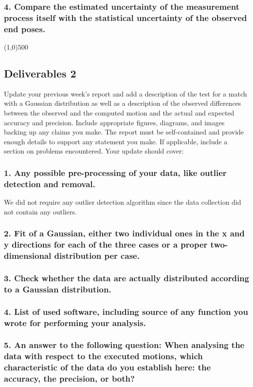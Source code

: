 \documentclass[11pt,a4paper,openright,twoside]{extreport}
\newcommand{\sectionLine}{\begin{center}\line(1,0){500}\end{center}}
\begin{document}
\subsubsection*{4. Compare the estimated uncertainty of the measurement process itself with the statistical uncertainty of the observed end poses.}

\sectionLine
\subsection*{Deliverables 2}
Update your previous week’s report and add a description of the test for a match with a Gaussian distribution as well as a description of the observed differences between the observed and the computed motion and the actual and expected accuracy and precision. Include appropriate figures, diagrams, and images backing up any claims you make. The report must be self-contained and provide enough details to support any statement you make. If applicable, include a section on problems encountered. Your update should cover:

\subsubsection*{1. Any possible pre-processing of your data, like outlier detection and removal.}
We did not require any outlier detection algorithm since the data collection did not contain any outliers.

\subsubsection*{2. Fit of a Gaussian, either two individual ones in the x and y directions for each of the three cases or a proper two-dimensional distribution per case.}

\subsubsection*{3. Check whether the data are actually distributed according to a Gaussian distribution.}

\subsubsection*{4. List of used software, including source of any function you wrote for performing your analysis.}

\subsubsection*{5. An answer to the following question: When analysing the data with respect to the executed motions, which characteristic of the data do you establish here: the accuracy, the precision, or both?}
\end{document}

